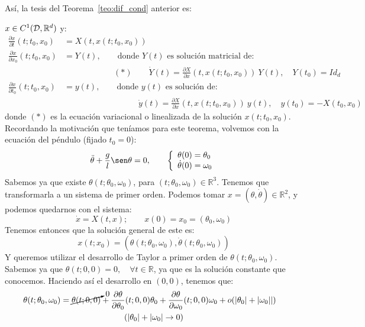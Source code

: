 \noindent
Así, la tesis del Teorema~\ref{teo:dif_cond} anterior es:

\noindent
$x\in C^{1}(\mathcal{D},\mathbb{R}^d)$ y:
\begin{align*}
    \frac{\partial x}{\partial t}(t;t_0,x_0) &= X(t,x(t;t_0,x_0)) \\
    \frac{\partial x}{\partial x_0}(t;t_0,x_0) &= Y(t), \qquad \text{donde $Y(t)$ es solución matricial de:} \\
                                               &\qquad \qquad\qquad (\ast)\qquad   \dot{Y}(t) = \frac{\partial X}{\partial x}(t,x(t;t_0,x_0))\ Y(t), \quad Y(t_0)  = Id_d \\
    \frac{\partial x}{\partial t_0}(t;t_0,x_0) &= y(t), \qquad \text{donde $y(t)$ es solución de:} \\
                                               &\qquad \qquad\qquad \quad \qquad   \dot{y}(t) = \frac{\partial X}{\partial x}(t,x(t;t_0,x_0))\ y(t), \quad y(t_0)  = -X(t_0,x_0)
\end{align*} 
donde $(\ast)$ es la ecuación variacional o linealizada de la solución $x(t;t_0,x_0)$.\\

\noindent
Recordando la motivación que teníamos para este teorema, volvemos con la ecuación del péndulo (fijado $t_0 = 0$):
\begin{equation*}
    \ddot{\theta} + \frac{g}{l}\sen\theta = 0, \qquad \left\{\begin{array}{l}
        \theta(0) = \theta_0 \\
        \dot{\theta}(0) = \omega_0
    \end{array}\right.
\end{equation*}
Sabemos ya que existe $\theta(t;\theta_0,\omega_0)$, para $(t;\theta_0,\omega_0)\in \mathbb{R}^3$. Tenemos que transformarla a un sistema de primer orden. Podemos tomar $x=(\theta,\dot{\theta})\in \mathbb{R}^2$, y podemos quedarnos con el sistema:
\begin{equation*}
    \dot{x} = X(t,x); \qquad x(0) = x_0 = (\theta_0, \omega_0)
\end{equation*}
Tenemos entonces que la solución general de este es:
\begin{equation*}
    x(t;x_0) = (\theta(t;\theta_0,\omega_0), \dot{\theta}(t;\theta_0,\omega_0))
\end{equation*}
Y queremos utilizar el desarrollo de Taylor a primer orden de $\theta(t;\theta_0,\omega_0)$. Sabemos ya que $\theta(t;0,0) = 0, \quad \forall t\in \mathbb{R}$, ya que es la solución constante que conocemos. Haciendo así el desarrollo en $(0,0)$, tenemos que:
\begin{multline}\label{eq:taylor_theta}
    \theta(t;\theta_0,\omega_0) = \cancelto{0}{\theta(t;0,0)} + \frac{\partial \theta}{\partial \theta_0}(t;0,0)\theta_0 + \frac{\partial \theta}{\partial \omega_0}(t;0,0)\omega_0 + o(|\theta_0| + |\omega_0||) \quad \\ (|\theta_0| + |\omega_0|\to 0)
\end{multline}


